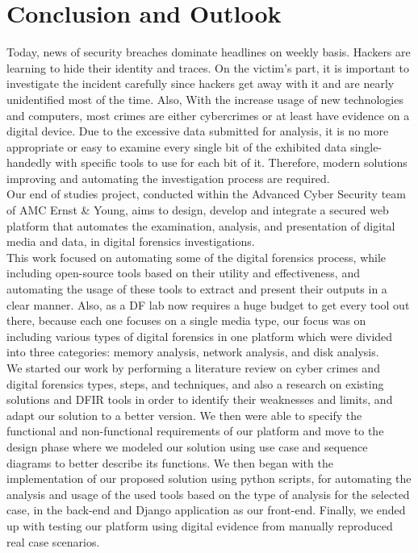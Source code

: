 \chapter*{Conclusion and Outlook}
\label{Intro}

Today, news of security breaches dominate headlines on weekly basis. Hackers are learning to hide their identity and traces. On the victim's part, it is important to investigate the incident carefully since hackers get away with it and are nearly unidentified most of the time. Also, With the increase usage of new technologies and computers, most crimes are either cybercrimes or at least have evidence on a digital device. Due to the excessive data submitted for analysis, it is no more appropriate or easy to examine every single bit of the exhibited data single-handedly with specific tools to use for each bit of it. Therefore, modern solutions improving and automating the investigation process are \vspace{3mm}required.\\
Our end of studies project, conducted within the Advanced Cyber Security team of AMC Ernst \& Young, aims to design, develop and integrate a secured web platform that automates the examination, analysis, and presentation of digital media and data, in digital forensics \vspace{3mm}investigations.\\
This work focused on automating some of the digital forensics process, while including open-source tools based on their utility and effectiveness, and automating the usage of these tools to extract and present their outputs in a clear manner. Also, as a DF lab now requires a huge budget to get every tool out there, because each one focuses on a single media type, our focus was on including various types of digital forensics in one platform which were divided into three categories: \vspace{3mm}memory analysis, network analysis, and disk analysis.\\
We started our work by performing a literature review on cyber crimes and digital forensics types, steps, and techniques, and also a research on existing solutions and DFIR tools in order to identify their weaknesses and limits, and adapt our solution to a better version. We then were able to specify the functional and non-functional requirements of our platform and move to the design phase where we modeled our solution using use case and sequence diagrams to better describe its functions. We then began with the implementation of our proposed solution using python scripts, for automating the analysis and usage of the used tools based on the type of analysis for the selected case, in the back-end and Django application as our front-end. Finally, we ended up with testing our platform using digital evidence from manually reproduced real case \vspace{3mm}scenarios.\\
